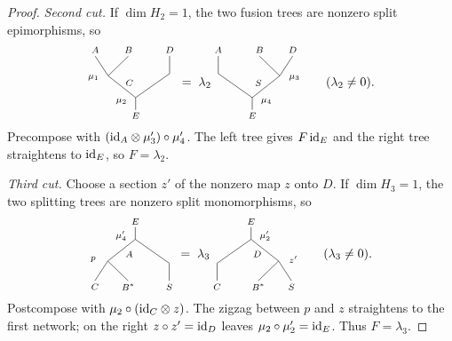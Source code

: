 \documentclass{amsart}
\begin{document}
\begin{proof}
\newcommand{\oneDimTree}[9]{\vcenter{\hbox{\begin{tikzpicture}[x=.73cm,y=.62cm,yscale=#1,xscale=#2,font=\scriptsize,inner sep=1pt]
\draw (0,2.45)--(0,1.89)--(-1.07,.90)--(-1.57,0);
\draw (-1.07,.90)--(-.28,0);\draw (0,1.89)--(1.32,.80)--(1.32,0);
\node at (0,2.71){$#3$};\node at (-1.57,-.28){$#4$};
\node at (-.28,-.28){$#5$};\node at (1.32,-.28){$#6$};
\node at (-.55,2.06){$#7$};\node at (-1.64,.98){$#8$};
\node at (-.24,1.22){$#9$};
\end{tikzpicture}}}}

\emph{Second cut.} If $\dim H_2=1$, the two fusion trees are nonzero split epimorphisms, so
\[
 \oneDimTree{-1}{1}{E}{A}{B}{D}{\mu_2}{\mu_1}{C}
 \;=\;\lambda_2\,
 \oneDimTree{-1}{-1}{E}{D}{B}{A}{\mu_4}{\mu_3}{S}
 \qquad (\lambda_2\ne0).
\]
Precompose with $(\mathrm{id}_A\otimes\mu'_3)\circ\mu'_4$. The left tree gives $F\,\mathrm{id}_E$ and the right tree straightens to $\mathrm{id}_E$, so $F=\lambda_2$.

\emph{Third cut.} Choose a section $z'$ of the nonzero map $z$ onto $D$. If $\dim H_3=1$, the two splitting trees are nonzero split monomorphisms, so
\[
 \oneDimTree{1}{1}{E}{C}{B^*}{S}{\mu'_4}{p}{A}
 \;=\;\lambda_3\,
 \oneDimTree{1}{-1}{E}{S}{B^*}{C}{\mu'_2}{z'}{D}
 \qquad (\lambda_3\ne0).
\]
Postcompose with $\mu_2\circ(\mathrm{id}_C\otimes z)$. The zigzag between $p$ and $z$ straightens to the first network; on the right $z\circ z'=\mathrm{id}_D$ leaves $\mu_2\circ\mu'_2=\mathrm{id}_E$. Thus $F=\lambda_3$.
\end{proof}

\newcommand{\spectrumtree}[1]{\vcenter{\hbox{%
\begin{tikzpicture}[x=.30cm,y=.31cm,line width=.55pt,line cap=round,line join=round]
\coordinate (a) at (0,2.42); \coordinate (b) at (1,2.42);
\coordinate (c) at (2,2.42); \coordinate (d) at (3,2.42);
\coordinate (o) at (1.5,0); \draw (o)--(1.5,-.47);
\ifcase#1\relax
 \coordinate (v) at (.5,1.70); \coordinate (w) at (1,.88);
 \draw (a)--(v)--(b); \draw (v)--(w)--(c); \draw (w)--(o)--(d);
\or
 \coordinate (v) at (.5,1.45); \coordinate (w) at (2.5,1.45);
 \draw (a)--(v)--(b); \draw (c)--(w)--(d); \draw (v)--(o)--(w);
\or
 \coordinate (v) at (2.5,1.70); \coordinate (w) at (2,.88);
 \draw (c)--(v)--(d); \draw (b)--(w)--(v); \draw (a)--(o)--(w);
\or
 \coordinate (v) at (1.5,1.70); \coordinate (w) at (1,.88);
 \draw (b)--(v)--(c); \draw (a)--(w)--(v); \draw (w)--(o)--(d);
\or
 \coordinate (v) at (1.5,1.70); \coordinate (w) at (2,.88);
 \draw (b)--(v)--(c); \draw (v)--(w)--(d); \draw (a)--(o)--(w);
\fi
\end{tikzpicture}}}}
\end{document}
